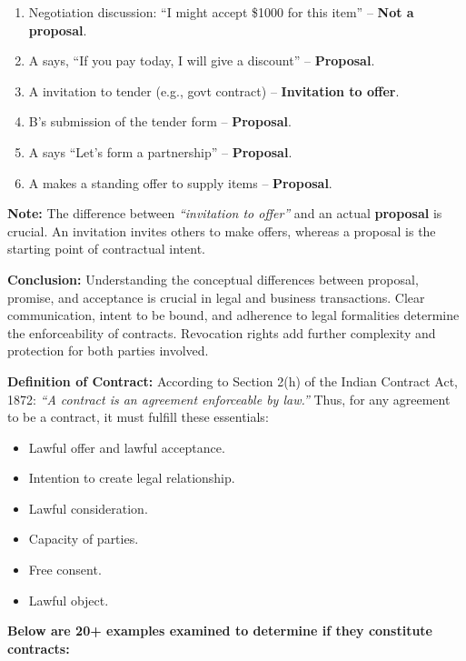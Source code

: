 \documentclass[12pt,a4paper]{book}
\begin{document}
\begin{enumerate}
    \item Negotiation discussion: “I might accept \$1000 for this item” – \textbf{Not a proposal}.
    \item A says, “If you pay today, I will give a discount” – \textbf{Proposal}.
    \item A invitation to tender (e.g., govt contract) – \textbf{Invitation to offer}.
    \item B’s submission of the tender form – \textbf{Proposal}.
    \item A says “Let’s form a partnership” – \textbf{Proposal}.
    \item A makes a standing offer to supply items – \textbf{Proposal}.
\end{enumerate}

\textbf{Note:} The difference between \textit{“invitation to offer”} and an actual \textbf{proposal} is crucial. An invitation invites others to make offers, whereas a proposal is the starting point of contractual intent.

\textbf{Conclusion:}  
Understanding the conceptual differences between proposal, promise, and acceptance is crucial in legal and business transactions. Clear communication, intent to be bound, and adherence to legal formalities determine the enforceability of contracts. Revocation rights add further complexity and protection for both parties involved.



\textbf{Definition of Contract:}  
According to Section 2(h) of the Indian Contract Act, 1872:  
\textit{“A contract is an agreement enforceable by law.”}  
Thus, for any agreement to be a contract, it must fulfill these essentials:
\begin{itemize}
    \item Lawful offer and lawful acceptance.
    \item Intention to create legal relationship.
    \item Lawful consideration.
    \item Capacity of parties.
    \item Free consent.
    \item Lawful object.
\end{itemize}

\vspace{0.4cm}
\textbf{Below are 20+ examples examined to determine if they constitute contracts:}
\end{document}
